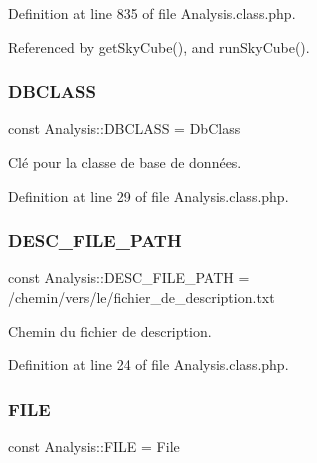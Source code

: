 Definition at line 835 of file Analysis.\+class.\+php.



Referenced by get\+Sky\+Cube(), and run\+Sky\+Cube().

\mbox{\label{class_analysis_abebb77d53cda3d0d7177299907657723}} 
\subsubsection{\texorpdfstring{D\+B\+C\+L\+A\+SS}{DBCLASS}}
{\footnotesize\ttfamily const Analysis\+::\+D\+B\+C\+L\+A\+SS = \textquotesingle{}Db\+Class\textquotesingle{}}

Clé pour la classe de base de données. 

Definition at line 29 of file Analysis.\+class.\+php.

\mbox{\label{class_analysis_a0c2610c8d837b3212cecf61585e96dfe}} 
\subsubsection{\texorpdfstring{D\+E\+S\+C\+\_\+\+F\+I\+L\+E\+\_\+\+P\+A\+TH}{DESC\_FILE\_PATH}}
{\footnotesize\ttfamily const Analysis\+::\+D\+E\+S\+C\+\_\+\+F\+I\+L\+E\+\_\+\+P\+A\+TH = \textquotesingle{}/chemin/vers/le/fichier\+\_\+de\+\_\+description.\+txt\textquotesingle{}}

Chemin du fichier de description. 

Definition at line 24 of file Analysis.\+class.\+php.

\mbox{\label{class_analysis_a08c7b7b5ac0d24684338f5edca8c9268}} 
\subsubsection{\texorpdfstring{F\+I\+LE}{FILE}}
{\footnotesize\ttfamily const Analysis\+::\+F\+I\+LE = \textquotesingle{}File\textquotesingle{}}

